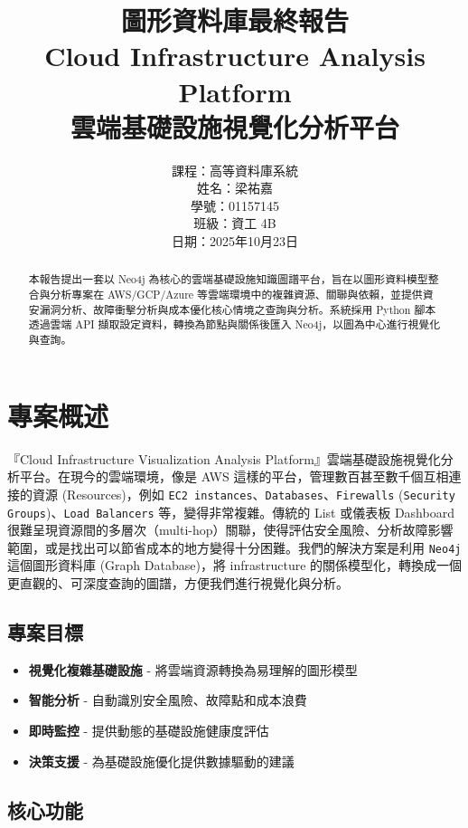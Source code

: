 \documentclass[11pt,a4paper]{ctexart}
\title{圖形資料庫最終報告\\Cloud Infrastructure Analysis Platform\\雲端基礎設施視覺化分析平台}
\author{課程：高等資料庫系統\\姓名：梁祐嘉\\學號：01157145\\班級：資工 4B\\日期：2025年10月23日}
\date{}
\begin{document}
\maketitle

\renewcommand{\abstractname}{\large 摘要}
\begin{abstract}
\normalsize
本報告提出一套以 Neo4j 為核心的雲端基礎設施知識圖譜平台，旨在以圖形資料模型整合與分析專案在 AWS/GCP/Azure 等雲端環境中的複雜資源、關聯與依賴，並提供資安漏洞分析、故障衝擊分析與成本優化核心情境之查詢與分析。系統採用 Python 腳本透過雲端 API 擷取設定資料，轉換為節點與關係後匯入 Neo4j，以圖為中心進行視覺化與查詢。
\end{abstract}

\tableofcontents
\clearpage

\section{專案概述}

『Cloud Infrastructure Visualization Analysis Platform』雲端基礎設施視覺化分析平台。在現今的雲端環境，像是 AWS 這樣的平台，管理數百甚至數千個互相連接的資源 (Resources)，例如 \texttt{EC2 instances}、\texttt{Databases}、\texttt{Firewalls} (\texttt{Security Groups})、\texttt{Load Balancers} 等，變得非常複雜。傳統的 List 或儀表板 Dashboard 很難呈現資源間的多層次（multi-hop）關聯，使得評估安全風險、分析故障影響範圍，或是找出可以節省成本的地方變得十分困難。我們的解決方案是利用 \texttt{Neo4j} 這個圖形資料庫 (Graph Database)，將 infrastructure 的關係模型化，轉換成一個更直觀的、可深度查詢的圖譜，方便我們進行視覺化與分析。

\subsection{專案目標}
\begin{itemize}[leftmargin=1.5em]
\item \textbf{視覺化複雜基礎設施} - 將雲端資源轉換為易理解的圖形模型
\item \textbf{智能分析} - 自動識別安全風險、故障點和成本浪費
\item \textbf{即時監控} - 提供動態的基礎設施健康度評估
\item \textbf{決策支援} - 為基礎設施優化提供數據驅動的建議
\end{itemize}

\subsection{核心功能}
\end{document}
